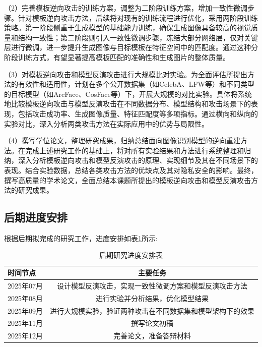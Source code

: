 （2）完善模板逆向攻击的训练方案，调整为二阶段训练方案，增加一致性微调步骤。针对模板逆向攻击方法，后续将对现有的训练流程进行优化，采用两阶段训练策略。第一阶段侧重于生成模型的基础能力训练，确保生成图像具备较高的视觉质量和结构一致性；第二阶段则引入一致性微调步骤，冻结大部分网络层，仅对关键层进行微调，进一步提升生成图像与目标模板在特征空间中的匹配度。通过这种分阶段训练方式，有望显著提高模板匹配的准确性和生成图片的整体质量。

（3）对模板逆向攻击和模型反演攻击进行大规模比对实验。为全面评估所提出方法的有效性和适用性，计划在多个公开数据集（如CelebA、LFW等）和不同类型的目标模型（如ArcFace、CosFace等）下，开展大规模的对比实验。具体将系统地比较模板逆向攻击与模型反演攻击在不同数据分布、模型结构和攻击场景下的表现，包括攻击成功率、生成图像质量、特征匹配度等多项指标。通过横向和纵向的实验对比，深入分析两类攻击方法在实际应用中的优势与局限性。

（4）撰写学位论文，整理研究成果，归纳总结面向图像识别模型的逆向重建方法。在完成上述研究工作的基础上，将对所有实验结果和方法进行系统整理和归纳，深入分析模板逆向攻击和模型反演攻击的原理、实现细节及其在不同场景下的表现。结合实验数据，总结各类攻击方法的优缺点及其对隐私安全的影响。最终，撰写高质量的学术论文，全面总结本课题所提出的模板逆向攻击和模型反演攻击方法的研究成果。


\subsection{后期进度安排}

根据后期拟完成的研究工作，进度安排如表\ref{tab:progress_schedule}所示:
\begin{table}[H]
  \centering
  \caption{后期研究进度安排表}
  \begin{tabular}{lc}
    \hline
    时间节点     & 主要任务                           \\
    \hline
    2025年07月 & 设计模型反演攻击，实现一致性微调方案和模型反演攻击方法   \\
    \hline
    2025年08月 & 进行实验并分析结果，优化模型结果              \\
    \hline
    2025年09月 & 进行大规模实验，验证两种攻击在不同数据集和模型架构下的效果 \\
    \hline
    2025年11月 & 撰写论文初稿                         \\
    \hline
    2025年12月 & 完善论文，准备答辩材料                   \\
    \hline
  \end{tabular}
  \label{tab:progress_schedule}
\end{table}

